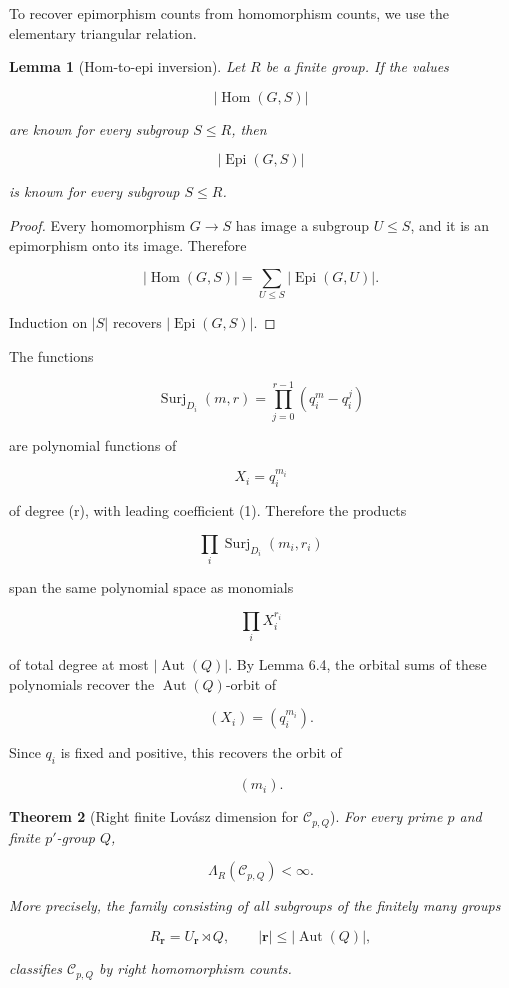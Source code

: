 \documentclass[11pt]{article}
\newtheorem{theorem}{Theorem}[section]
\newtheorem{lemma}[theorem]{Lemma}
\begin{document}
To recover epimorphism counts from homomorphism counts, we use the elementary triangular relation.

\begin{lemma}[Hom-to-epi inversion]
Let $R$ be a finite group. If the values

\[
|\operatorname{Hom}(G,S)|
\]

are known for every subgroup $S\le R$, then

\[
|\operatorname{Epi}(G,S)|
\]

is known for every subgroup $S\le R$.

\end{lemma}

\begin{proof}
Every homomorphism $G\to S$ has image a subgroup $U\le S$, and it is an epimorphism onto its image. Therefore

\[
|\operatorname{Hom}(G,S)|
=\sum_{U\le S}
|\operatorname{Epi}(G,U)|.
\]

Induction on $|S|$ recovers $|\operatorname{Epi}(G,S)|$.

\end{proof}

The functions

\[
\operatorname{Surj}_{D_i}(m,r)
=\prod_{j=0}^{r-1}(q_i^m-q_i^j)
\]

are polynomial functions of

\[
X_i=q_i^{m_i}
\]

of degree (r), with leading coefficient (1). Therefore the products

\[
\prod_i\operatorname{Surj}_{D_i}(m_i,r_i)
\]

span the same polynomial space as monomials

\[
\prod_i X_i^{r_i}
\]

of total degree at most $|\operatorname{Aut}(Q)|$. By Lemma 6.4, the orbital sums of these polynomials recover the $\operatorname{Aut}(Q)$-orbit of

\[
(X_i)=(q_i^{m_i}).
\]

Since $q_i$ is fixed and positive, this recovers the orbit of

\[
(m_i).
\]

\begin{theorem}[Right finite Lovász dimension for $\mathcal C_{p,Q}$]
For every prime $p$ and finite $p'$-group $Q$,

\[
\Lambda_R(\mathcal C_{p,Q})<\infty.
\]

More precisely, the family consisting of all subgroups of the finitely many groups

\[
R_{\mathbf r}=U_{\mathbf r}\rtimes Q,
\qquad
|\mathbf r|\le|\operatorname{Aut}(Q)|,
\]

classifies $\mathcal C_{p,Q}$ by right homomorphism counts.

\end{theorem}
\end{document}
